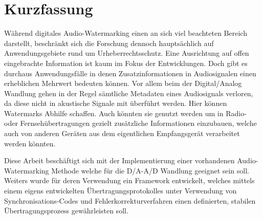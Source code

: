 \chapter*{Kurzfassung}

Während digitales Audio-Watermarking einen an sich viel beachteten Bereich darstellt, beschränkt sich die Forschung dennoch hauptsächlich auf Anwendungsgebiete rund um Urheberrechtsschutz. Eine Ausrichtung auf offen eingebrachte Information ist kaum im Fokus der Entwicklungen. Doch gibt es durchaus Anwendungsfälle in denen Zusatzinformationen in Audiosignalen einen erheblichen Mehrwert bedeuten können. Vor allem beim der Digital/Analog Wandlung gehen in der Regel sämtliche Metadaten eines Audiosignals verloren, da diese nicht in akustische Signale mit überführt werden.
Hier können Watermarks Abhilfe schaffen. Auch könnten sie genutzt werden um in Radio- oder Fernsehübertragungen gezielt zusätzliche Informationen einzubauen, welche auch von anderen Geräten aus dem eigentlichen Empfangsgerät verarbeitet werden könnten.

Diese Arbeit beschäftigt sich mit der Implementierung einer vorhandenen Audio-Watermarking Methode welche für die D/A-A/D Wandlung geeignet sein soll. Weiters wurde für deren Verwendung ein Framework entwickelt, welches mittels einem eigens entwickelten Übertragungsprotokolles unter Verwendung von Synchronisations-Codes und Fehlerkorrekturverfahren einen definierten, stabilen Übertragungsprozess gewährleisten soll. 